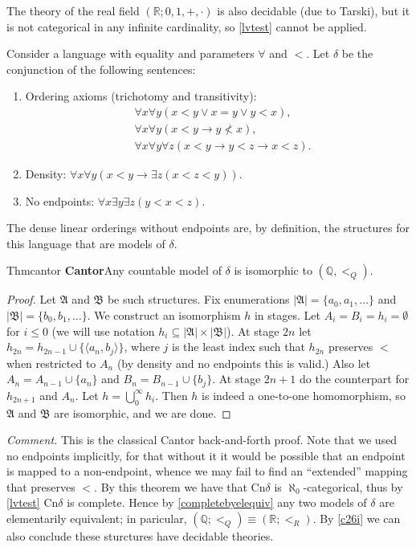 The theory of the real field $(\mathbb{R};0,1,+,\cdot)$ is also decidable (due to Tarski), but it is not categorical in any infinite cardinality, so \ref{lvtest} cannot be applied.

Consider a language with equality and parameters $\forall$ and $<$. Let $\delta$ be the conjunction of the following sentences:
\begin{enumerate}
  \item Ordering axioms (trichotomy and transitivity):
        \begin{align*}
           & \forall x\forall y(x<y\vee x=y\vee y<x),        \\
           & \forall x\forall y(x<y\to y\not <x),            \\
           & \forall x\forall y\forall z(x<y\to y<z\to x<z).
        \end{align*}
  \item Density: $\forall x\forall y(x<y\to\exists z(x<z<y))$.
  \item No endpoints: $\forall x\exists y\exists z(y<x<z)$.
\end{enumerate}
The dense linear orderings without endpoints are, by definition, the structures for this language that are models of $\delta$.

\begin{reference}{Thm}{cantor}
  \textbf{Cantor}\quad Any countable model of $\delta$ is isomorphic to $(\mathbb{Q},<_Q)$.
\end{reference}

\begin{proof}
  Let $\mathfrak{A}$ and $\mathfrak{B}$ be such structures. Fix enumerations $|\mathfrak{A}|=\{a_0,a_1,\dots\}$ and $|\mathfrak{B}|=\{b_0,b_1,\dots\}$. We construct an isomorphism $h$ in stages. Let $A_i=B_i=h_i=\emptyset$ for $i\leq0$ (we will use notation $h_i\subseteq|\mathfrak{A}|\times|\mathfrak{B}|$). At stage $2n$ let $h_{2n}=h_{2n-1}\cup\{\langle a_n,b_j\rangle\}$, where $j$ is the least index such that $h_{2n}$ preserves $<$ when restricted to $A_n$ (by density and no endpoints this is valid.) Also let $A_n=A_{n-1}\cup\{a_n\}$ and $B_n=B_{n-1}\cup\{b_j\}$. At stage $2n+1$ do the counterpart for $h_{2n+1}$ and $A_n$. Let $h=\bigcup_0^{\infty}h_i$. Then $h$ is indeed a one-to-one homomorphism, so $\mathfrak{A}$ and $\mathfrak{B}$ are isomorphic, and we are done.
\end{proof}

\textit{Comment.} This is the classical Cantor back-and-forth proof. Note that we used no endpoints implicitly, for that without it it would be possible that an endpoint is mapped to a non-endpoint, whence we may fail to find an ``extended'' mapping that preserves $<$. By this theorem we have that $\mathrm{Cn}\delta$ is $\aleph_0$-categorical, thus by \ref{lvtest} $\mathrm{Cn}\delta$ is complete. Hence by \ref{completebyelequiv} any two models of $\delta$ are elementarily equivalent; in paricular, $(\mathbb{Q};<_Q)\equiv(\mathbb{R};<_R)$. By \ref{c26i} we can also conclude these sturctures have decidable theories.

